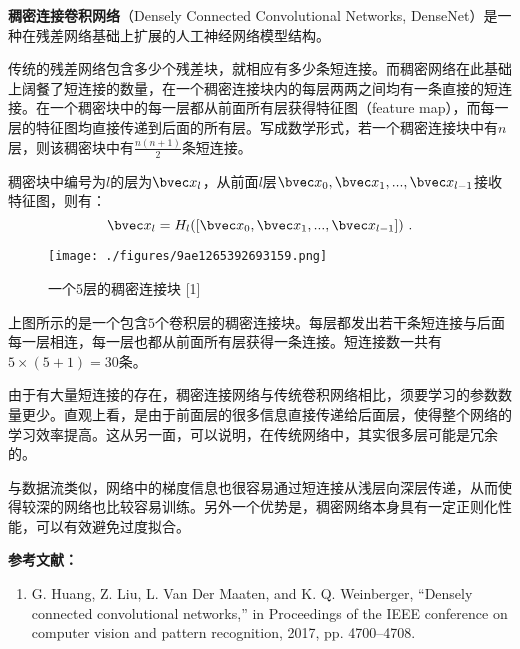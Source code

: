 


\textbf{稠密连接卷积网络}（Densely Connected Convolutional Networks, DenseNet）是一种在残差网络基础上扩展的人工神经网络模型结构。

传统的残差网络包含多少个残差块，就相应有多少条短连接。而稠密网络在此基础上阔餐了短连接的数量，在一个稠密连接块内的每层两两之间均有一条直接的短连接。在一个稠密块中的每一层都从前面所有层获得特征图（feature map），而每一层的特征图均直接传递到后面的所有层。写成数学形式，若一个稠密连接块中有$n$层，则该稠密块中有$\frac{n(n+1)}{2}$条短连接。

稠密块中编号为$l$的层为$\bvec x_l$，从前面$l$层$\bvec x_0, \bvec x_1, ..., \bvec x_{l-1}$接收特征图，则有：
\begin{equation}
\bvec x_l=H_l([\bvec x_0, \bvec x_1, ..., \bvec x_{l-1}])~.
\end{equation}

\begin{figure}[ht]
\centering
\texttt{[image: ./figures/9ae1265392693159.png]}
\caption{一个5层的稠密连接块 [1]} \label{fig_DensNe_1}
\end{figure}
上图所示的是一个包含$5$个卷积层的稠密连接块。每层都发出若干条短连接与后面每一层相连，每一层也都从前面所有层获得一条连接。短连接数一共有$5\times(5+1)=30$条。

由于有大量短连接的存在，稠密连接网络与传统卷积网络相比，须要学习的参数数量更少。直观上看，是由于前面层的很多信息直接传递给后面层，使得整个网络的学习效率提高。这从另一面，可以说明，在传统网络中，其实很多层可能是冗余的。

与数据流类似，网络中的梯度信息也很容易通过短连接从浅层向深层传递，从而使得较深的网络也比较容易训练。另外一个优势是，稠密网络本身具有一定正则化性能，可以有效避免过度拟合。


\textbf{参考文献：}
\begin{enumerate}
\item G. Huang, Z. Liu, L. Van Der Maaten, and K. Q. Weinberger, “Densely connected convolutional networks,” in Proceedings of the IEEE conference on computer vision and pattern recognition, 2017, pp. 4700–4708.
\end{enumerate}
